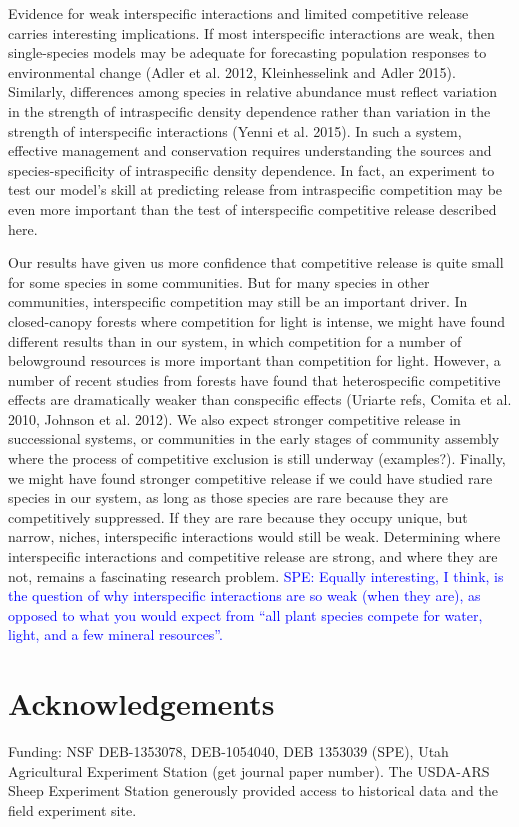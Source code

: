 \documentclass[11pt]{article}
\newcommand{\comment}{\textcolor{blue}}
\begin{document}
\begin{doublespacing}
Evidence for weak interspecific interactions and limited competitive release carries interesting implications. If most interspecific interactions are weak, then single-species models may be adequate for forecasting population responses to environmental change (Adler et al. 2012, Kleinhesselink and Adler 2015). Similarly, differences among species in relative abundance must reflect variation in the strength of intraspecific density dependence rather than variation in the strength of interspecific interactions (Yenni et al. 2015). In such a system, effective management and conservation requires understanding the sources and species-specificity of intraspecific density dependence. In fact, an experiment to test our model's skill at predicting release from intraspecific competition may be even more important than the test of interspecific competitive release described here.

Our results have given us more confidence that competitive release is quite small for some species in some communities. But for many species in other communities, interspecific competition may still be an important driver. In closed-canopy forests where competition for light is intense, we might have found different results than in our system, in which competition for a number of belowground resources is more important than competition for light. However, a number of recent studies from forests have found that heterospecific competitive effects are dramatically weaker than conspecific effects (Uriarte refs, Comita et al. 2010, Johnson et al. 2012). We also expect stronger competitive release in successional systems, or communities in the early stages of community assembly where the process of competitive exclusion is still underway (examples?). Finally, we might have found stronger competitive release if we could have studied rare species in our system, as long as those species are rare because they are competitively suppressed. If they are rare because they occupy unique, but narrow, niches, interspecific interactions would still be weak. Determining where interspecific interactions and competitive release are strong, and where they are not, remains a fascinating research problem. \comment{SPE: Equally interesting, I think, is the question of why interspecific
interactions are so weak (when they are), as opposed to what you would expect from ``all plant species compete for water, light, and a few mineral resources''.} 
  
\section*{Acknowledgements}

Funding: NSF DEB-1353078, DEB-1054040, DEB 1353039 (SPE), Utah Agricultural Experiment Station (get journal paper number). The USDA-ARS Sheep Experiment Station generously provided access to historical data and the field experiment site. 

\newpage




\end{doublespacing} 
\end{document}

